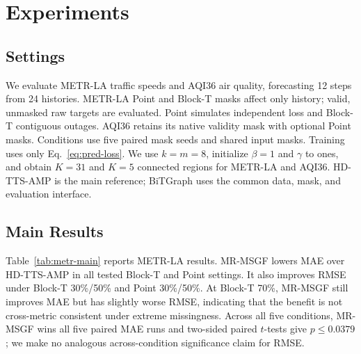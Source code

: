 \documentclass{article}
\begin{document}
\section{Experiments}

\subsection{Settings}

We evaluate METR-LA traffic speeds and AQI36 air quality, forecasting 12 steps from 24 histories. METR-LA Point and Block-T masks affect only history; valid, unmasked raw targets are evaluated. Point simulates independent loss and Block-T contiguous outages. AQI36 retains its native validity mask with optional Point masks. Conditions use five paired mask seeds and shared input masks. Training uses only Eq.~\eqref{eq:pred-loss}. We use $k=m=8$, initialize $\beta=1$ and $\gamma$ to ones, and obtain $K=31$ and $K=5$ connected regions for METR-LA and AQI36. HD-TTS-AMP is the main reference; BiTGraph uses the common data, mask, and evaluation interface.

\subsection{Main Results}

Table~\ref{tab:metr-main} reports METR-LA results. MR-MSGF lowers MAE over HD-TTS-AMP in all tested Block-T and Point settings. It also improves RMSE under Block-T 30\%/50\% and Point 30\%/50\%. At Block-T 70\%, MR-MSGF still improves MAE but has slightly worse RMSE, indicating that the benefit is not cross-metric consistent under extreme missingness. Across all five conditions, MR-MSGF wins all five paired MAE runs and two-sided paired $t$-tests give $p\leq0.0379$; we make no analogous across-condition significance claim for RMSE.
\end{document}
